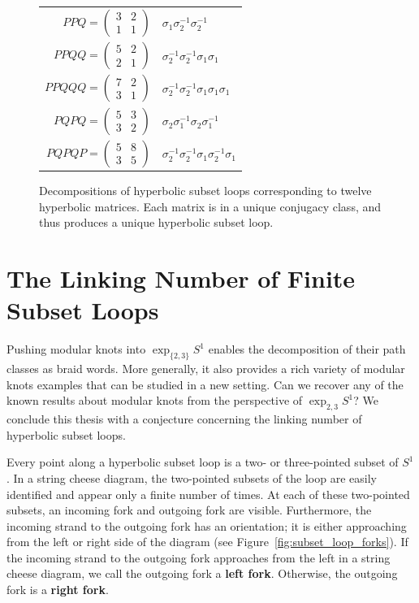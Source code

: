 \documentclass[12pt,twoside]{reedthesis}
\theoremstyle{definition}
\newcommand{\exptwothree}{\exp_{\{2,3\}}}
\newcommand{\defnphrase}[1]{\textbf{#1}}
\begin{document}
\begin{figure}[p]
\begin{tabular}{r l}
   $PPQ = \begin{pmatrix}3 & 2 \\ 1 & 1\end{pmatrix}$ & $\sigma_1 \sigma_2^{-1} \sigma_2^{-1}$ \\[1em]
   $PPQQ = \begin{pmatrix}5 & 2 \\ 2 & 1\end{pmatrix}$ & $\sigma_2^{-1} \sigma_2^{-1} \sigma_1 \sigma_1$ \\[1em]
   $PPQQQ = \begin{pmatrix}7 & 2 \\ 3 & 1\end{pmatrix}$ & $\sigma_2^{-1} \sigma_2^{-1} \sigma_1 \sigma_1 \sigma_1$ \\[1em]
   $PQPQ = \begin{pmatrix}5 & 3 \\ 3 & 2\end{pmatrix}$ & $\sigma_2 \sigma_1^{-1} \sigma_2 \sigma_1^{-1}$ \\[1em]
   $PQPQP = \begin{pmatrix}5 & 8 \\ 3 & 5\end{pmatrix}$ & $\sigma_2^{-1} \sigma_2^{-1} \sigma_1 \sigma_2^{-1} \sigma_1$
  \end{tabular}
  \caption{Decompositions of hyperbolic subset loops corresponding to twelve hyperbolic matrices. Each matrix is in a unique conjugacy class, and thus produces a unique hyperbolic subset loop.}
  \label{fig:subset_loop_decompositions_table}
\end{figure}

\vspace{-1em}
\section{The Linking Number of Finite Subset Loops}

Pushing modular knots into $\exptwothree S^1$ enables the decomposition of their path classes as braid words.
More generally, it also provides a rich variety of modular knots examples that can be studied in a new setting.
Can we recover any of the known results about modular knots from the perspective of $\exp_{2,3} S^1$?
We conclude this thesis with a conjecture concerning the linking number of hyperbolic subset loops.

Every point along a hyperbolic subset loop is a two- or three-pointed subset of $S^1$.
In a string cheese diagram, the two-pointed subsets of the loop are easily identified and appear only a finite number of times.
At each of these two-pointed subsets, an incoming fork and outgoing fork are visible.
Furthermore, the incoming strand to the outgoing fork has an orientation; it is either approaching from the left or right side of the diagram (see Figure~\ref{fig:subset_loop_forks}). 
If the incoming strand to the outgoing fork approaches from the left in a string cheese diagram, we call the outgoing fork a \defnphrase{left fork}.
Otherwise, the outgoing fork is a \defnphrase{right fork}.
\end{document}
